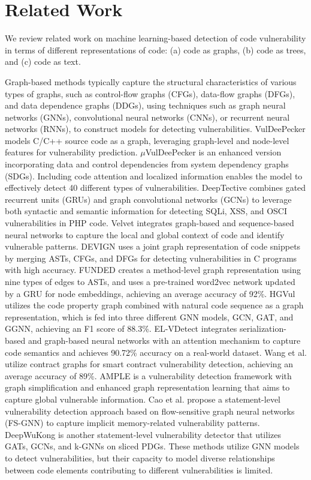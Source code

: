 \section{Related Work}
We review related work on machine learning-based detection of code vulnerability in terms of different representations of code: (a) code as graphs, (b) code as trees, and (c) code as text.  


Graph-based methods typically capture the structural characteristics of various types of graphs, such as control-flow graphs (CFGs), data-flow graphs (DFGs), and data dependence graphs (DDGs), using techniques such as graph neural networks (GNNs), convolutional neural networks (CNNs), or recurrent neural networks (RNNs), to construct models for detecting vulnerabilities. VulDeePecker \cite{Li2018} models C/C++ source code as a graph, leveraging graph-level and node-level features for vulnerability prediction. $\mu$VulDeePecker \cite{zou2019} is an enhanced version incorporating data and control dependencies from system dependency graphs (SDGs). Including code attention and localized information enables the model to effectively detect 40 different types of vulnerabilities. DeepTective \cite{rabheru2022hybrid}  combines gated recurrent units (GRUs) and graph convolutional networks (GCNs) to leverage both syntactic and semantic information for detecting SQLi, XSS, and OSCI vulnerabilities in PHP code. Velvet \cite{ding2022velvet} integrates graph-based and sequence-based neural networks to capture the local and global context of code and identify vulnerable patterns. DEVIGN \cite{zhou2019devign} uses a joint graph representation of code snippets by merging ASTs, CFGs, and DFGs for detecting vulnerabilities in C programs with high accuracy. FUNDED \cite{Wang2020} creates a method-level graph representation using nine types of edges to ASTs, and uses a pre-trained word2vec network updated by a GRU for node embeddings, achieving an average accuracy of 92\%. HGVul \cite{song2022hgvul} utilizes the code property graph combined with natural code sequence as a graph representation, which is fed into three different GNN models, GCN, GAT, and GGNN, achieving an F1 score of 88.3\%. EL-VDetect \cite{sun2023enhanced} integrates serialization-based and graph-based neural networks with an attention mechanism to capture code semantics and achieves 90.72\% accuracy on a real-world dataset. Wang et al. \cite{liu2021combining} utilize contract graphs for smart contract vulnerability detection, achieving an average accuracy of 89\%. AMPLE \cite{wen2023vulnerability} is a vulnerability detection framework with graph simplification and enhanced graph representation learning that aims to capture global vulnerable information. Cao et al. \cite{cao2022mvd} propose a statement-level vulnerability detection approach based on flow-sensitive graph neural networks (FS-GNN) to capture implicit memory-related vulnerability patterns. DeepWuKong \cite{cheng2021deepwukong} is another statement-level vulnerability detector that utilizes GATs, GCNs, and k-GNNs on sliced PDGs. These methods utilize GNN models to detect vulnerabilities, but their capacity to model diverse relationships between code elements contributing to different vulnerabilities is limited.

